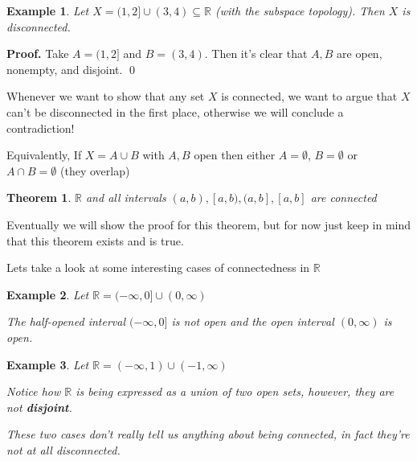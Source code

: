 \documentclass{article}
\newtheorem*{theorem*}{Theorem}
\newtheorem*{example*}{Example}
\begin{document}
\begin{tcolorbox}[colback=example!65]
    \begin{example*}
       Let $X = (1, 2] \cup (3,4) \subseteq \mathbb{R}$ (with the subspace topology). Then $X$ is disconnected.
    \end{example*}
    
    \textbf{Proof.} Take $A = (1,2]$ and $B = (3,4)$. Then it's clear that $A, B$ are open, nonempty, and disjoint. \qed
\end{tcolorbox}

Whenever we want to show that any set $X$ is connected, we want to argue that $X$ can't be disconnected in the first place, otherwise we will conclude a contradiction!

Equivalently, If $X = A \cup B$ with $A, B$ open then either $A = \emptyset$, $B = \emptyset$ or $A \cap B = \emptyset$ (they overlap)

\begin{tcolorbox}[colback=theorem!75]
    \begin{theorem*}
        $\mathbb{R}$ and all intervals $(a, b), [a, b), (a,b], [a,b]$ are connected
    \end{theorem*}
\end{tcolorbox}

Eventually we will show the proof for this theorem, but for now just keep in mind that this theorem exists and is true.
\vspace{2mm}

Lets take a look at some interesting cases of connectedness in $\mathbb{R}$

\begin{tcolorbox}[colback=example!65]
    \begin{example*}
       Let $\mathbb{R} = (-\infty, 0] \cup (0, \infty)$
        
        The half-opened interval $(-\infty, 0]$ is not open and the open interval $(0, \infty)$ is open.
        \vspace{2mm}
    \end{example*}
    \begin{example*}
        Let $\mathbb{R} = (-\infty, 1 ) \cup (-1, \infty)$ 
        
        Notice how $\mathbb{R}$ is being expressed as a union of two open sets, however, they are not \textbf{disjoint}.
        \vspace{2mm}

        These two cases don't really tell us anything about being connected, in fact they're not at all disconnected.
    \end{example*}
\end{tcolorbox}
\end{document}

